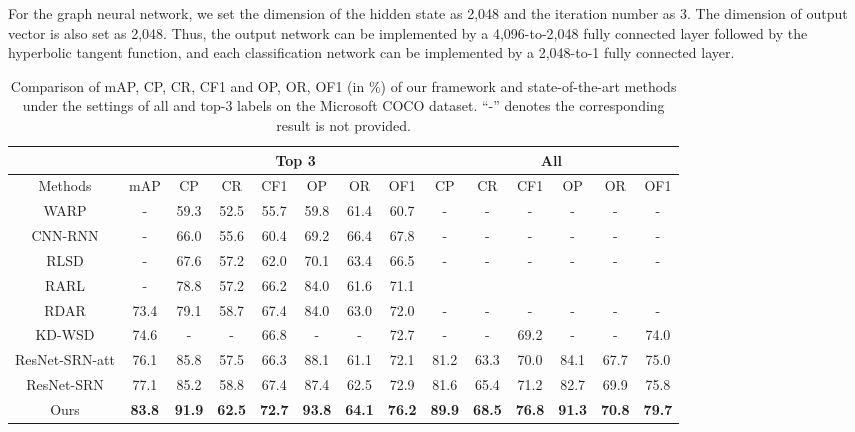 \documentclass[10pt,twocolumn,letterpaper]{article}
\begin{document}
For the graph neural network, we set the dimension of the hidden state as 2,048 and the iteration number  as 3. The dimension of output vector  is also set as 2,048. Thus, the output network  can be implemented by a 4,096-to-2,048 fully connected layer followed by the hyperbolic tangent function, and each classification network  can be implemented by a 2,048-to-1 fully connected layer.

\begin{table*}[!t]
\centering
\begin{tabular}{c|c|cccccc|cccccc}
\hline
&  & \multicolumn{6}{c|}{Top 3} &\multicolumn{6}{c}{All} \\
\hline
\centering  Methods & mAP & CP & CR & CF1 & OP & OR & OF1  & CP & CR & CF1 & OP & OR & OF1 \\
\hline
\hline
WARP \cite{gong2013deep}   &- & 59.3 & 52.5 & 55.7 & 59.8 & 61.4 & 60.7 & - & - & -&-  & -&- \\
CNN-RNN \cite{wang2016cnn} &- & 66.0 & 55.6 & 60.4 & 69.2 & 66.4 & 67.8 &- & - & -&-  & -&-\\
RLSD \cite{zhang2018multi} &- & 67.6 & 57.2 & 62.0 & 70.1 & 63.4 & 66.5 &- & - & -&-  & -&-\\
RARL \cite{chen2018recurrent} & - & 78.8 & 57.2 & 66.2 & 84.0 & 61.6 & 71.1 & \\
RDAR \cite{wang2017multi} & 73.4 & 79.1 &  58.7 & 67.4 & 84.0 & 63.0 & 72.0 &- & - & -&-  & -&-\\
KD-WSD \cite{DBLP:conf/mm/LiuSSYXP18}& 74.6 & - & -& 66.8 & - &- &72.7  &- &-& 69.2 & - & -&74.0 \\
ResNet-SRN-att \cite{zhu2017learning} & 76.1 & 85.8 & 57.5 & 66.3 & 88.1 & 61.1 & 72.1 & 81.2 & 63.3 & 70.0 & 84.1 & 67.7 & 75.0\\
ResNet-SRN \cite{zhu2017learning} & 77.1 & 85.2 & 58.8 & 67.4 & 87.4 & 62.5 & 72.9 & 81.6 & 65.4 & 71.2 & 82.7 & 69.9 & 75.8 \\
\hline
Ours & \textbf{83.8} & \textbf{91.9} & \textbf{62.5} & \textbf{72.7} & \textbf{93.8} & \textbf{64.1} & \textbf{76.2} & \textbf{89.9} & \textbf{68.5} & \textbf{76.8} & \textbf{91.3} & \textbf{70.8} & \textbf{79.7}\\
\hline
\end{tabular}
\caption{Comparison of mAP, CP, CR, CF1 and OP, OR, OF1 (in \%) of our framework and state-of-the-art methods under the settings of all and top-3 labels on the Microsoft COCO dataset. ``-'' denotes the corresponding result is not provided.}
\vspace{-10pt}
\label{table:result-coco}
\end{table*}
\end{document}
